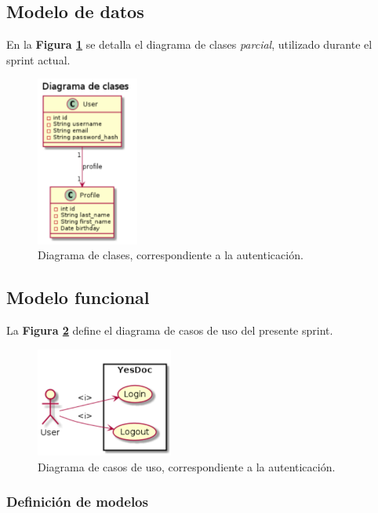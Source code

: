 


\subsection{Modelo de datos}

En la \textbf{Figura \ref{5-clase_autenticacion}} se detalla el diagrama de clases \textit{parcial}, utilizado durante el sprint actual.

\begin{figure}[h]
        \centering
        \includegraphics[width=0.3\textwidth]{img/clases_auth}
        \caption{Diagrama de clases, correspondiente a la autenticación.}
		\label{5-clase_autenticacion}
    \end{figure}


\subsection{Modelo funcional} 
La \textbf{Figura \ref{4-cu_autenticacion}} define el diagrama de casos de uso del presente sprint.

    \begin{figure}[h]
        \centering
        \includegraphics[width=0.4\textwidth]{img/cu_autenticacion}
        \caption{Diagrama de casos de uso, correspondiente a la autenticación.}
		\label{4-cu_autenticacion}
    \end{figure}


\subsubsection{Definición de modelos}

